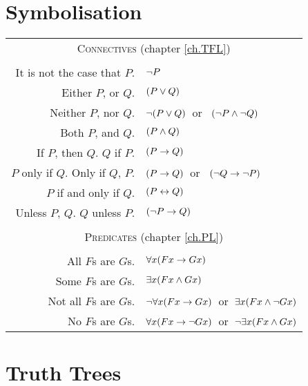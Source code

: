 \documentclass[PHIL101-Textbook.tex]{subfiles}
\begin{document}
\section*{Symbolisation}
\label{app.symbolisation}
\begin{tabular*}{\textwidth}{rl}
\multicolumn{2}{c}{\textsc{Connectives} (chapter \ref{ch.TFL})}\\ \\
It is not the case that $P$. & $\neg P$\\
Either $P$, or $Q$. & $(P \vee Q)$\\
Neither $P$, nor $Q$. & $\neg(P \vee Q)$\ or \ $(\neg P \land \neg Q)$\\
Both $P$, and $Q$. & $(P \land Q)$\\
If $P$, then $Q$. $Q$ if $P$. & $(P \rightarrow Q)$\\
$P$ only if $Q$. Only if $Q$, $P$. & $(P \rightarrow Q)$\ or \ $(\neg Q \rightarrow \neg P)$\\
$P$ if and only if $Q$. & $(P \leftrightarrow Q)$\\
Unless $P$, $Q$. $Q$ unless $P$. & $(\neg P \rightarrow Q)$\\
\\
\multicolumn{2}{c}{\label{SymbolizingPredicates}\textsc{Predicates} (chapter \ref{ch.PL})}\\ \\
All $F$s are $G$s. & $\forall x(Fx \rightarrow Gx)$\\
Some $F$s are $G$s. & $\exists x(Fx \land Gx)$\\
Not all $F$s are $G$s. & $\neg\forall x(Fx \rightarrow Gx)$\ or\ $\exists x(Fx \land \neg Gx)$\\
No $F$s are $G$s. & $\forall x(Fx \rightarrow\neg Gx)$\ or\ $\neg\exists x(Fx \land Gx)$\\

\end{tabular*}


\newpage

\section*{Truth Trees}
\end{document}
